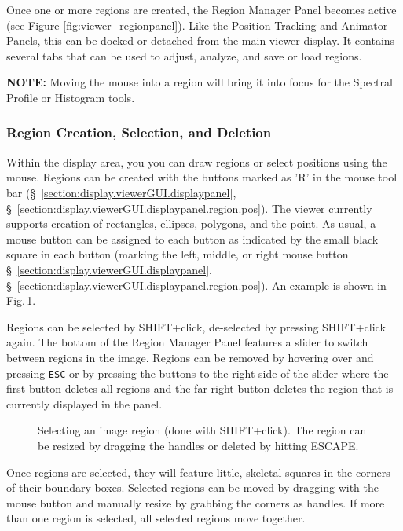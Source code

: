 Once one or more regions are created, the Region Manager Panel becomes
active (see Figure \ref{fig:viewer_regionpanel}). Like the Position Tracking and 
Animator Panels, this can be docked or detached from the main viewer display.
It contains several tabs that can be used to adjust, analyze, and save or load regions.

{\bf NOTE:} Moving the mouse into a region will bring it into focus for the Spectral Profile or
Histogram tools.

\subsubsection{Region Creation, Selection, and Deletion}
\label{section:display.image.region.create}

Within the display area, you you can draw regions or select positions using the mouse. 
Regions can be created with the buttons marked as 'R' in the mouse
tool bar (\S~\ref{section:display.viewerGUI.displaypanel},
\S~\ref{section:display.viewerGUI.displaypanel.region.pos}).  The viewer
currently supports creation of rectangles, ellipses, polygons, and the point. As
usual, a mouse button can be assigned to each button as indicated by
the small black square in each button (marking the left, middle, or
right mouse button \S~\ref{section:display.viewerGUI.displaypanel},
\S~\ref{section:display.viewerGUI.displaypanel.region.pos}). An example
is shown in Fig.\,\ref{fig:viewer_regionselected}.

Regions can be selected by SHIFT+click, de-selected by pressing
  SHIFT+click again. The bottom of the
  Region Manager Panel features a slider to switch between regions
in the image. Regions can be removed by hovering over and pressing
{\tt ESC} or by pressing the buttons to the right side of the slider
where the first button deletes all regions and the far right button
deletes the region that is currently displayed in the panel.

\begin{figure}[h!]
\begin{center}
\caption{\label{fig:viewer_regionselected} Selecting an image region (done with SHIFT+click). The region
can be resized by dragging the handles or deleted by hitting ESCAPE.}
\hrulefill
\end{center}
\end{figure}

Once regions are selected, they will feature little, skeletal squares
in the corners of their boundary boxes. Selected regions can be moved by dragging 
with the mouse button and manually resize by grabbing the corners as handles.
If more than one region is selected, all selected regions move together.

